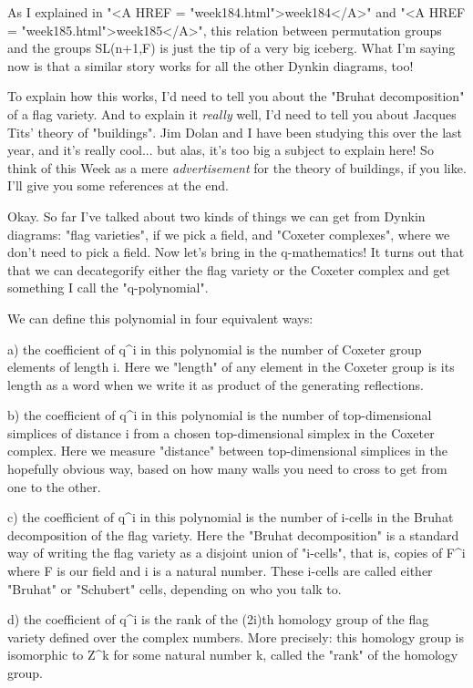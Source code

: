 As I explained in "<A HREF = "week184.html">week184</A>" and "<A HREF = "week185.html">week185</A>", this relation between 
permutation groups and the groups SL(n+1,F) is just the tip of a 
very big iceberg.  What I'm saying now is that a similar story works 
for all the other Dynkin diagrams, too!  

To explain how this works, I'd need to tell you about the "Bruhat
decomposition" of a flag variety.  And to explain it \emph{really} well, 
I'd need to tell you about Jacques Tits' theory of "buildings".  Jim 
Dolan and I have been studying this over the last year, and it's really 
cool... but alas, it's too big a subject to explain here!  So think of 
this Week as a mere \emph{advertisement} for the theory of buildings, if you 
like.  I'll give you some references at the end.

Okay.  So far I've talked about two kinds of things we can get from
Dynkin diagrams: "flag varieties", if we pick a field, and "Coxeter
complexes", where we don't need to pick a field.  Now let's bring
in the q-mathematics!  It turns out that that we can decategorify 
either the flag variety or the Coxeter complex and get something
I call the "q-polynomial".  

We can define this polynomial in four equivalent ways:

a) the coefficient of q^{i} in this polynomial is the number of
Coxeter group elements of length i.  Here we "length" of any 
element in the Coxeter group is its length as a word when we 
write it as product of the generating reflections.

b) the coefficient of q^{i} in this polynomial is the number of
top-dimensional simplices of distance i from a chosen top-dimensional
simplex in the Coxeter complex.  Here we measure "distance" between
top-dimensional simplices in the hopefully obvious way, based on how 
many walls you need to cross to get from one to the other.

c) the coefficient of q^{i} in this polynomial is the number of
i-cells in the Bruhat decomposition of the flag variety.  Here the
"Bruhat decomposition" is a standard way of writing the flag
variety as a disjoint union of "i-cells", that is, copies of
F^{i} where F is our field and i is a natural number.  These
i-cells are called either "Bruhat" or "Schubert"
cells, depending on who you talk to.

d) the coefficient of q^{i} is the rank of the (2i)th homology group of
the flag variety defined over the complex numbers.  More precisely:
this homology group is isomorphic to Z^{k} for some natural number k,
called the "rank" of the homology group.

